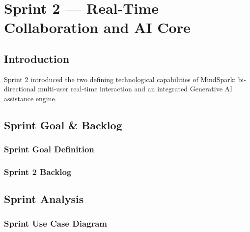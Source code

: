 
\chapter{Sprint 2 --- Real-Time Collaboration and AI Core}
\label{chap:sprint2}


\section{Introduction}
\label{sec:ch5_intro}
Sprint 2 introduced the two defining technological capabilities of MindSpark: bi-directional multi-user real-time interaction and an integrated Generative AI assistance engine.

\section{Sprint Goal \& Backlog}
\label{sec:ch5_goal_backlog}
\subsection{Sprint Goal Definition}
\label{subsec:ch5_sprint_goal}

\subsection{Sprint 2 Backlog}
\label{subsec:ch5_sprint_backlog}

\section{Sprint Analysis}
\label{sec:ch5_analysis}
\subsection{Sprint Use Case Diagram}
\label{subsec:ch5_use_case_diag}

